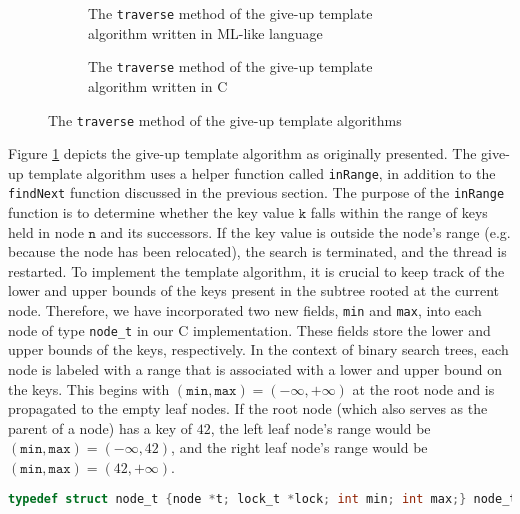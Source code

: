 \documentclass[a4paper,UKenglish,cleveref, autoref, thm-restate]{lipics-v2021}
\newcommand{\wm}[1]{\textbf{\textcolor{violet}{[Willam: #1]}}}
\begin{document}
\begin{figure}[!ht]
	\begin{subfigure}[t]{0.45\textwidth}
		 
		\caption{The \lstinline{traverse} method of the give-up template algorithm written in ML-like language}
		\label{traverse_giveup_a}	
	\end{subfigure}\qquad
	\begin{subfigure}[t]{0.48\textwidth}
		 
		\caption{The \lstinline{traverse} method of the give-up template algorithm written in C}
		\label{traverse_giveup_b}
	\end{subfigure}
	\caption{The \lstinline{traverse} method of the give-up template algorithms}
	\label{traverse_giveup}
\end{figure}

Figure \ref{traverse_giveup_a} depicts the give-up template algorithm as originally presented. The give-up template algorithm uses a helper function called \lstinline{inRange}, in addition to the \lstinline{findNext} function discussed in the previous section. The purpose of the \lstinline{inRange} function is to determine whether the key value $\texttt{k}$ falls within the range of keys held in node $\texttt{n}$ and its successors. If the key value is outside the node's range (e.g. because the node has been relocated), the search is terminated, and the thread is restarted. To implement the template algorithm, it is crucial to keep track of the lower and upper bounds of the keys present in the subtree rooted at the current node. Therefore, we have incorporated two new fields, \lstinline{min} and \lstinline{max}, into each node of type \lstinline{node_t} in our C implementation. These fields store the lower and upper bounds of the keys, respectively. In the context of binary search trees, each node is labeled with a range that is associated with a lower and upper bound on the keys. This begins with $(\texttt{min}, \texttt{max}) = (-\infty, +\infty)$ at the root node and is propagated to the empty leaf nodes. If the root node (which also serves as the parent of a node) has a key of $42$, the left leaf node's range would be $(\texttt{min}, \texttt{max}) = (-\infty, 42)$, and the right leaf node's range would be $(\texttt{min}, \texttt{max}) = (42, +\infty)$.

\begin{lstlisting}[language = C, backgroundcolor=\color{white}, basicstyle=\ttfamily\footnotesize]
	typedef struct node_t {node *t; lock_t *lock; int min; int max;} node_t;
\end{lstlisting}
\end{document}
